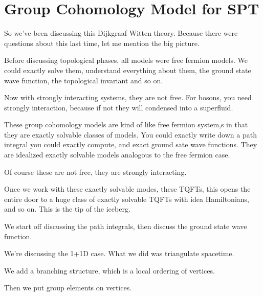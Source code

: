 \section{Group Cohomology Model for SPT}
So we've been discussing this Dijkgraaf-Witten theory.
Because there were questions about this last time,
let me mention the big picture.

Before discussing topological phases,
all models were free fermion models.
We could exactly solve them,
understand everything about them,
the ground state wave function,
the topological invariant and so on.

Now with strongly interacting systems,
they are not free.
For bosons,
you need strongly interaction,
because if not they will condensed into a superfluid.

These group cohomology models are kind of like free fermion system,s
in that they are exactly solvable classes of models.
You could exactly write down a path integral you could exactly compute,
and exact ground sate wave functions.
They are idealized exactly solvable models analogous to the free fermion case.

Of course these are not free,
they are strongly interacting.

Once we work with these exactly solvable modes,
these TQFTs,
this opens the entire door to a huge class of exactly solvable TQFTs with idea
Hamiltonians,
and so on.
This is the tip of the iceberg.

We start off discussing the path integrals,
then discuss the ground state wave function.

We're discussing the 1+1D case.
What we did was triangulate spacetime.

We add a branching structure,
which is a local ordering of vertices.

Then we put group elements on vertices.

